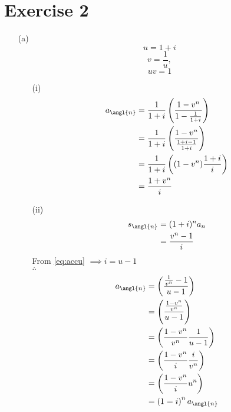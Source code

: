 \documentclass[12pt,a4paper]{article}
\begin{document}
\section*{Exercise 2}
\begin{enumerate}
		\item[(a)]
				\begin{equation}
						u  =  1 + i
						\label{eq:accu}
				\end{equation}
				\begin{equation}
						v  =  \frac{1}{u},
						\label{eq:discount}
				\end{equation}
				\begin{equation}
						uv = 1
						\label{eq:acc_dis}
				\end{equation}
				\begin{enumerate}
						\item[(i)]  
							\begin{align*}
									a_{\angl{n}} &=  \frac{1}{1 + i}  \left(   \frac{ 1-v^n  } {  1 -   \frac{  1}{1+i}}    \right)\\
									       &=  \frac{1}{1 + i}   \left(   \frac{ 1-v^n  } {  \frac{ 1 + i -1 }{1+i}  }    \right)\\
									       &=  \frac{1}{1 + i}  \left(   (1 -  v^n)  \frac{ 1+i}{i}    \right)\\
									       &=  \frac{1+v^n}{i}
							\end{align*}
						\item[(ii)]  
						      \begin{align*}
						      			s_{\angl{n}}  &=  (1+i)^n a_n\\
						      			       &=  \frac{v^n  -1}{i}
						      \end{align*}
						      From \eqref{eq:accu} $ \implies  i  =  u -1$  \\
						      $\therefore$
						      \begin{align*}
						      			a_{\angl{n}}  &=  \left(   \frac{  \frac{1}{v^n}  -1 }{ u -1}  \right)\\
						      			      &=  \left(   \frac{  \frac{ 1-v^n }{v^n}  }{ u -1}  \right)\\
						      			      &=  \left(  \frac{ 1-v^n }{v^n}   \frac{ 1}{u-1}  \right)\\
						      			      &= \left(  \frac{ 1-v^n}{i}   \frac{i}{v^n}  \right) \\
						      			      &=   \left(  \frac{ 1-v^n}{i}   u^n  \right) \\
						      			      &= \left(  1= i \right) ^n a_{\angl{n}} 
						      \end{align*}
						      

\end{enumerate}
\end{enumerate}
\end{document}

